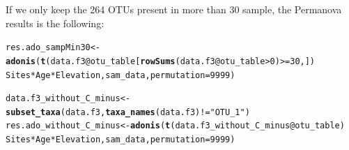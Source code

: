 \documentclass[12pt]{article}\usepackage[]{graphicx}\usepackage[]{color}
\makeatletter
\newcommand{\hlnum}[1]{\textcolor[rgb]{0.686,0.059,0.569}{#1}}%
\newcommand{\hlstr}[1]{\textcolor[rgb]{0.192,0.494,0.8}{#1}}%
\newcommand{\hlopt}[1]{\textcolor[rgb]{0,0,0}{#1}}%
\newcommand{\hlstd}[1]{\textcolor[rgb]{0.345,0.345,0.345}{#1}}%
\newcommand{\hlkwb}[1]{\textcolor[rgb]{0.69,0.353,0.396}{#1}}%
\newcommand{\hlkwc}[1]{\textcolor[rgb]{0.333,0.667,0.333}{#1}}%
\newcommand{\hlkwd}[1]{\textcolor[rgb]{0.737,0.353,0.396}{\textbf{#1}}}%
\newenvironment{kframe}{%
 \def\at@end@of@kframe{}%
 \ifinner\ifhmode%
  \def\at@end@of@kframe{\end{minipage}}%
  \begin{minipage}{\columnwidth}%
 \fi\fi%
 \def\FrameCommand##1{\hskip\@totalleftmargin \hskip-\fboxsep
 \colorbox{shadecolor}{##1}\hskip-\fboxsep
     \hskip-\linewidth \hskip-\@totalleftmargin \hskip\columnwidth}%
 \MakeFramed {\advance\hsize-\width
   \@totalleftmargin\z@ \linewidth\hsize
   \@setminipage}}%
 {\par\unskip\endMakeFramed%
 \at@end@of@kframe}
\newenvironment{knitrout}{}{} %
\numberwithin{figure}{section}
\makeatother
\begin{document}
If we only keep the 264 OTUs present in more than 30 sample, the Permanova results is the following:
\begin{knitrout}\small
{}\color{fgcolor}\begin{kframe}
\begin{alltt}
\hlstd{res.ado_sampMin30} \hlkwb{<-} \hlkwd{adonis}\hlstd{(}\hlkwd{t}\hlstd{(data.f3}\hlopt{@}\hlkwc{otu_table}\hlstd{[}\hlkwd{rowSums}\hlstd{(data.f3}\hlopt{@}\hlkwc{otu_table}\hlopt{>}\hlnum{0}\hlstd{)}\hlopt{>=}\hlnum{30}\hlstd{,])} \hlopt{~}
                              \hlstd{Sites} \hlopt{*} \hlstd{Age} \hlopt{*} \hlstd{Elevation, sam_data,} \hlkwc{permutation} \hlstd{=} \hlnum{9999}\hlstd{)}
\end{alltt}
\end{kframe}
\end{knitrout}

\begin{knitrout}\small
{}\color{fgcolor}\begin{kframe}
\begin{alltt}
\hlstd{data.f3_without_C_minus} \hlkwb{<-} \hlkwd{subset_taxa}\hlstd{(data.f3,} \hlkwd{taxa_names}\hlstd{(data.f3)}\hlopt{!=}\hlstr{"OTU_1"}\hlstd{)}
\hlstd{res.ado_without_C_minus} \hlkwb{<-} \hlkwd{adonis}\hlstd{(}\hlkwd{t}\hlstd{(data.f3_without_C_minus}\hlopt{@}\hlkwc{otu_table}\hlstd{)} \hlopt{~}
                              \hlstd{Sites} \hlopt{*} \hlstd{Age} \hlopt{*} \hlstd{Elevation, sam_data,} \hlkwc{permutation} \hlstd{=} \hlnum{9999}\hlstd{)}
\end{alltt}
\end{kframe}
\end{knitrout}
\end{document}
